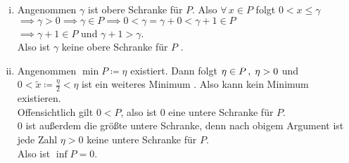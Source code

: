 \documentclass[../ana1.tex]{subfiles}
\begin{document}
\begin{bew}\leavevmode
	\begin{enumerate}[(i)]
		\item Angenommen \(\gamma \) ist obere Schranke für \(P \). Also \(\forall \, x \in P \) folgt \( 0 < x \leq \gamma \) \\
			  \(\implies \gamma > 0 \implies \gamma \in P \implies 0 < \gamma = \gamma + 0 < \gamma + 1 \in P \) \\
			  \(\implies \gamma + 1 \in P \) und \(\gamma + 1 > \gamma \). \\
			  Also ist \(\gamma \) keine obere Schranke für \(P \) \Lightning.
		\item Angenommen \(\min P \coloneqq \eta \) existiert. Dann folgt \( \eta \in P \operatorname{,}  \; \eta > 0 \) und
		      \(0 < \tilde{x} \coloneqq \frac{\eta}{2} < \eta \) ist ein weiteres Minimum \Lightning. Also kann kein Minimum existieren. \\
			  Offensichtlich gilt \(0 < P \), also ist \(0 \) eine untere Schranke für \(P \). \\
			  \(0 \) ist außerdem die größte untere Schranke, denn nach obigem Argument ist jede Zahl \(\eta > 0 \) keine untere Schranke für \(P \). \\
			  Also ist \(\inf P = 0 \). \qedhere
	\end{enumerate}
\end{bew}
\end{document}
